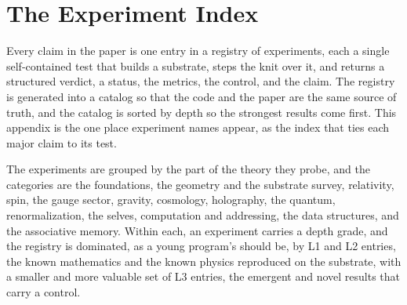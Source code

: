 \section{The Experiment Index}
\label{app:experiments}

Every claim in the paper is one entry in a registry of experiments, each a single self-contained test that builds a substrate, steps the knit over it, and returns a structured verdict, a status, the metrics, the control, and the claim. The registry is generated into a catalog so that the code and the paper are the same source of truth, and the catalog is sorted by depth so the strongest results come first. This appendix is the one place experiment names appear, as the index that ties each major claim to its test.

The experiments are grouped by the part of the theory they probe, and the categories are the foundations, the geometry and the substrate survey, relativity, spin, the gauge sector, gravity, cosmology, holography, the quantum, renormalization, the selves, computation and addressing, the data structures, and the associative memory. Within each, an experiment carries a depth grade, and the registry is dominated, as a young program's should be, by L1 and L2 entries, the known mathematics and the known physics reproduced on the substrate, with a smaller and more valuable set of L3 entries, the emergent and novel results that carry a control.

